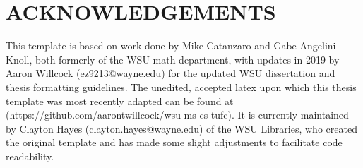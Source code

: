 \section*{ACKNOWLEDGEMENTS}

\begin{center}
	This template is based on work done by Mike Catanzaro and Gabe Angelini-Knoll, both formerly of the WSU math department, with updates in 2019 by Aaron Willcock (ez9213@wayne.edu) for the updated WSU dissertation and thesis formatting guidelines. The unedited, accepted latex upon which this thesis template was most recently adapted can be found at (https://github.com/aarontwillcock/wsu-ms-cs-tufc).
	It is currently maintained by Clayton Hayes (clayton.hayes@wayne.edu) of the WSU Libraries, who created the original template and has made some slight adjustments to facilitate code readability.
\end{center}
